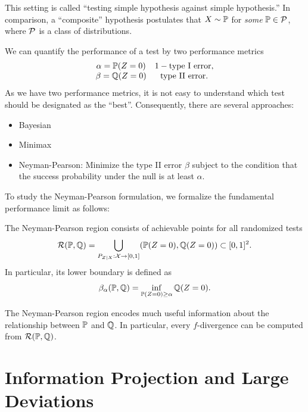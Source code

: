 \begin{remark}
    This setting is called ``testing simple hypothesis against simple hypothesis.''
In comparison, a ``composite'' hypothesis postulates that $X\sim \mathbb{P}$ for \textit{some} $\mathbb{P}\in\mathcal{P}$, where $\mathcal{P}$ is a class of distributions.
\end{remark}

We can quantify the performance of a test by two performance metrics
\begin{equation*}
\begin{matrix}
 \alpha=\mathbb{P}(Z=0) & 1-\text{type I error},\\
\beta=\mathbb{Q}(Z=0)& \text{type II error}.
\end{matrix}
\end{equation*}
As we have two performance metrics, it is not easy to understand which test should be designated as the ``best''.
Consequently, there are several approaches:
\begin{itemize}
    \item Bayesian
    \item Minimax
    \item Neyman-Pearson: Minimize the type II error $\beta$ subject to the condition that the success probability under the null is at least $\alpha$.
\end{itemize}
To study the Neyman-Pearson formulation, we formalize the fundamental performance limit as follows:
\begin{definition}
    The Neyman-Pearson region consists of achievable points for all randomized tests
    \begin{equation*}
        \mathcal{R}(\mathbb{P},\mathbb{Q})=\bigcup_{P_{Z|X}:\mathcal{X}\to [0,1]}(\mathbb{P}(Z=0),\mathbb{Q}(Z=0))\subset [0,1]^2.
    \end{equation*}
    In particular, its lower boundary is defined as
    \begin{equation*}
        \beta_\alpha(\mathbb{P},\mathbb{Q})=\inf_{\mathbb{P}(Z=0)\geq \alpha}\mathbb{Q}(Z=0).
    \end{equation*}
\end{definition}
\begin{remark}
    The Neyman-Pearson region encodes much useful information about the relationship between $\mathbb{P}$ and $\mathbb{Q}$.
    In particular, every $f$-divergence can be computed from $\mathcal{R}(\mathbb{P},\mathbb{Q})$.
\end{remark}

\section{Information Projection and Large Deviations}

